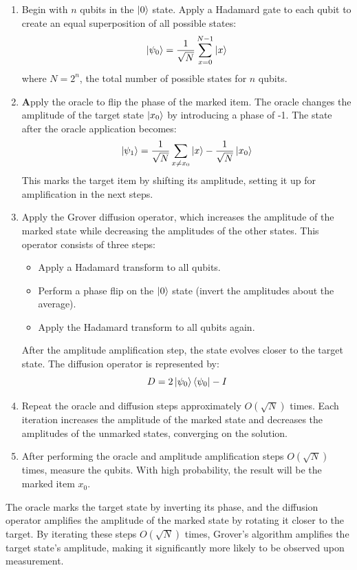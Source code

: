 \documentclass{article}
\begin{document}
		\begin{enumerate}
			\item Begin with \( n \) qubits in the \( \ket{0} \) state. Apply a Hadamard gate to each qubit to create an equal superposition of all possible states:
			\[
			\ket{\psi_0} = \frac{1}{\sqrt{N}} \sum_{x=0}^{N-1} \ket{x}
			\]
			where \( N = 2^n \), the total number of possible states for \( n \) qubits.
		
			\item \textbf Apply the oracle to flip the phase of the marked item. The oracle changes the amplitude of the target state \( \ket{x_0} \) by introducing a phase of -1. The state after the oracle application becomes:
			\[
			\ket{\psi_1} = \frac{1}{\sqrt{N}} \sum_{x \neq x_0} \ket{x} - \frac{1}{\sqrt{N}} \ket{x_0}
			\]
			This marks the target item by shifting its amplitude, setting it up for amplification in the next steps.
		
			\item Apply the Grover diffusion operator, which increases the amplitude of the marked state while decreasing the amplitudes of the other states. This operator consists of three steps:
			\begin{itemize}
				\item Apply a Hadamard transform to all qubits.
				\item Perform a phase flip on the \( \ket{0} \) state (invert the amplitudes about the average).
				\item Apply the Hadamard transform to all qubits again.
			\end{itemize}
			After the amplitude amplification step, the state evolves closer to the target state. The diffusion operator is represented by:
			\[
			D = 2\ket{\psi_0}\bra{\psi_0} - I
			\]
		
			\item Repeat the oracle and diffusion steps approximately \( O(\sqrt{N}) \) times. Each iteration increases the amplitude of the marked state and decreases the amplitudes of the unmarked states, converging on the solution.
		
			\item After performing the oracle and amplitude amplification steps \( O(\sqrt{N}) \) times, measure the qubits. With high probability, the result will be the marked item \( x_0 \).
		\end{enumerate}
		
		The oracle marks the target state by inverting its phase, and the diffusion operator amplifies the amplitude of the marked state by rotating it closer to the target. By iterating these steps \( O(\sqrt{N}) \) times, Grover’s algorithm amplifies the target state's amplitude, making it significantly more likely to be observed upon measurement.
		
\end{document}

